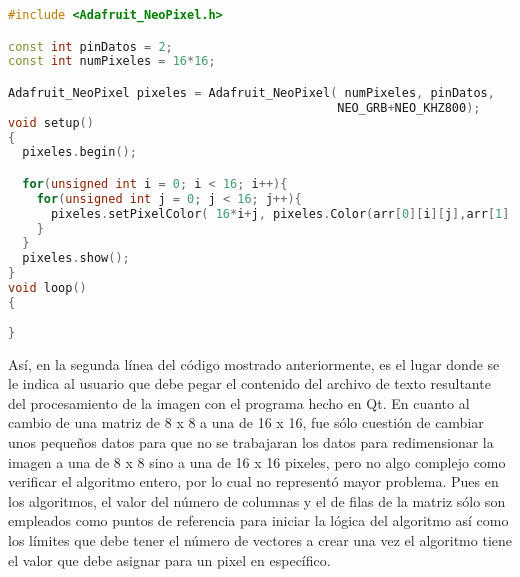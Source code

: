 \documentclass{article}
\begin{document}
\begin{lstlisting}[language=C++, label=final_tinker]
#include <Adafruit_NeoPixel.h>

const int pinDatos = 2;
const int numPixeles = 16*16;

Adafruit_NeoPixel pixeles = Adafruit_NeoPixel( numPixeles, pinDatos,
                                              NEO_GRB+NEO_KHZ800);
void setup()
{
  pixeles.begin();

  for(unsigned int i = 0; i < 16; i++){
    for(unsigned int j = 0; j < 16; j++){
      pixeles.setPixelColor( 16*i+j, pixeles.Color(arr[0][i][j],arr[1][i][j],arr[2][i][j]));
    }
  }
  pixeles.show();
}
void loop()
{
  
}
\end{lstlisting}
Así, en la segunda línea del código mostrado anteriormente, es el lugar donde se le indica al usuario que debe pegar el contenido del archivo de texto resultante del procesamiento de la imagen con el programa hecho en Qt.
En cuanto al cambio de una matriz de 8 x 8 a una de 16 x 16, fue sólo cuestión de cambiar unos pequeños datos para que no se trabajaran los datos para redimensionar la imagen a una de 8 x 8 sino a una de 16 x 16 pixeles, pero no algo complejo como verificar el algoritmo entero, por lo cual no representó mayor problema. Pues en los algoritmos, el valor del número de columnas y el de filas de la matriz sólo son empleados como puntos de referencia para iniciar la lógica del algoritmo así como los límites que debe tener el número de vectores a crear una vez el algoritmo tiene el valor que debe asignar para un pixel en específico.
\end{document}
